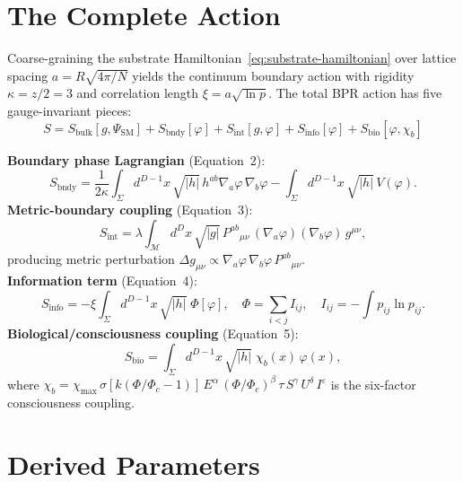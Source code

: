 \documentclass[12pt,oneside]{book}
\theoremstyle{definition}
\begin{document}
\section{The Complete Action}

Coarse-graining the substrate Hamiltonian~\eqref{eq:substrate-hamiltonian} over
lattice spacing $a = R\sqrt{4\pi/N}$ yields the continuum boundary action with
rigidity $\kappa = z/2 = 3$ and correlation length $\xi = a\sqrt{\ln p}$.
The total BPR action has five gauge-invariant pieces:
\begin{equation}
  \label{eq:total-action}
  \boxed{S = S_{\mathrm{bulk}}[g, \Psi_{\mathrm{SM}}]
           + S_{\mathrm{bndy}}[\varphi]
           + S_{\mathrm{int}}[g, \varphi]
           + S_{\mathrm{info}}[\varphi]
           + S_{\mathrm{bio}}[\varphi, \chi_b]}
\end{equation}

\begin{mathdetail}
\textbf{Boundary phase Lagrangian} (Equation~2):
\begin{equation}
  S_{\mathrm{bndy}} = \frac{1}{2\kappa}\int_\Sigma d^{D-1}x\,\sqrt{|h|}\,
  h^{ab}\nabla_a\varphi\,\nabla_b\varphi
  - \int_\Sigma d^{D-1}x\,\sqrt{|h|}\,V(\varphi).
\end{equation}
\textbf{Metric-boundary coupling} (Equation~3):
\begin{equation}
  S_{\mathrm{int}} = \lambda \int_\mathcal{M} d^D x\,\sqrt{|g|}\,
  P^{ab}{}_{\mu\nu}\,(\nabla_a\varphi)(\nabla_b\varphi)\,g^{\mu\nu},
\end{equation}
producing metric perturbation $\Delta g_{\mu\nu} \propto \nabla_a\varphi\,\nabla_b\varphi\,P^{ab}{}_{\mu\nu}$.\\
\textbf{Information term} (Equation~4):
\begin{equation}
  S_{\mathrm{info}} = -\xi\int_\Sigma d^{D-1}x\,\sqrt{|h|}\;\Phi[\varphi],
  \quad \Phi = \sum_{i<j} I_{ij}, \quad I_{ij} = -\int p_{ij}\ln p_{ij}.
\end{equation}
\textbf{Biological/consciousness coupling} (Equation~5):
\begin{equation}
  S_{\mathrm{bio}} = \int_\Sigma d^{D-1}x\,\sqrt{|h|}\;\chi_b(x)\,\varphi(x),
\end{equation}
where $\chi_b = \chi_{\max}\,\sigma[k(\Phi/\Phi_c - 1)]\,E^\alpha\,(\Phi/\Phi_c)^\beta\,\tau\,S^\gamma\,U^\delta\,I^\varepsilon$
is the six-factor consciousness coupling.
\end{mathdetail}

\section{Derived Parameters}
\end{document}

